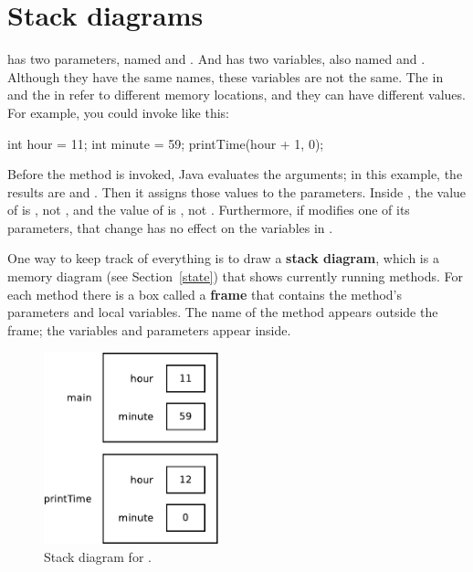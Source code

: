 \section{Stack diagrams}
\label{stack}

 has two parameters, named  and .
And  has two variables, also named  and .
Although they have the same names, these variables are not the same.
The  in  and the  in  refer to different memory locations, and they can have different values.
For example, you could invoke  like this:

\begin{code}
int hour = 11;
int minute = 59;
printTime(hour + 1, 0);
\end{code}

Before the method is invoked, Java evaluates the arguments; in this example, the results are  and .
Then it assigns those values to the parameters.
Inside , the value of  is , not , and the value of  is , not .
Furthermore, if  modifies one of its parameters, that change has no effect on the variables in .


One way to keep track of everything is to draw a {\bf stack diagram}, which is a memory diagram (see Section~\ref{state}) that shows currently running methods.
For each method there is a box called a {\bf frame} that contains the method's parameters and local variables.
The name of the method appears outside the frame; the variables and parameters appear inside.

\begin{figure}[!ht]
\begin{center}
\includegraphics[height=15em]{figs/stack1.pdf}
\caption{Stack diagram for .}
\label{fig.stack}
\end{center}
\end{figure}

